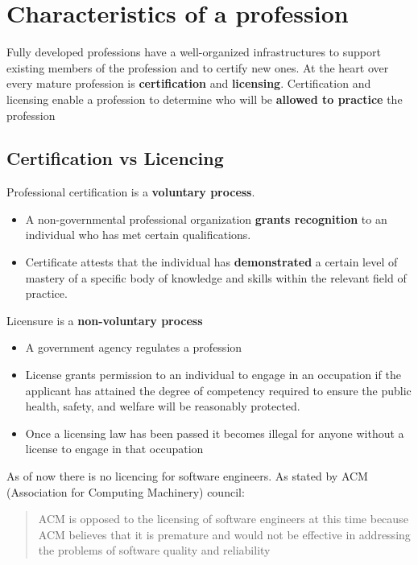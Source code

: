 \documentclass{article}
\begin{document}
\tableofcontents

\newpage

\section{Characteristics of a profession}

\begin{flushleft}
Fully developed professions have a well-organized infrastructures to support existing members of the profession and to certify new ones. At the heart over every mature profession is \textbf{certification} and \textbf{licensing}. Certification and licensing enable a profession to determine who will be \textbf{allowed to practice} the profession
\end{flushleft}

\subsection{Certification vs Licencing}
\begin{flushleft}
Professional certification is a \textbf{voluntary process}.
\begin{itemize}
  \item A non-governmental professional organization \textbf{grants recognition} to an individual who has met certain qualifications.
  \item Certificate attests that the individual has \textbf{demonstrated} a certain level of mastery of a specific body of knowledge and skills within the relevant field of practice.
\end{itemize}
Licensure is a \textbf{non-voluntary process}
\begin{itemize}
  \item A government agency regulates a profession
  \item License grants permission to an individual to engage in an occupation if the applicant has attained the degree of competency required to ensure the public health, safety, and welfare will be reasonably protected.
  \item Once a licensing law has been passed it becomes illegal for anyone without a license to engage in that occupation
\end{itemize}
\end{flushleft}

\begin{flushleft}
As of now there is no licencing for software engineers. As stated by ACM (Association for Computing Machinery) council:

\begin{quotation}
ACM is opposed to the licensing of software
engineers at this time because ACM believes that it is
premature and would not be effective in addressing
the problems of software quality and reliability
\end{quotation}

\end{flushleft}
\end{document}
